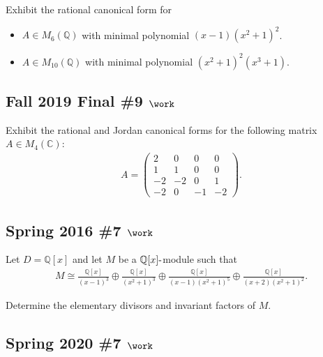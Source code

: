 Exhibit the rational canonical form for

\begin{itemize}
\tightlist
\item
  \(A\in M_6({\mathbb{Q}})\) with minimal polynomial
  \((x-1)(x^2 + 1)^2\).
\item
  \(A\in M_{10}({\mathbb{Q}})\) with minimal polynomial
  \((x^2+1)^2(x^3 + 1)\).
\end{itemize}

\hypertarget{fall-2019-final-9-work}{%
\subsection{\texorpdfstring{Fall 2019 Final \#9
\(\work\)}{Fall 2019 Final \#9 \textbackslash work}}\label{fall-2019-final-9-work}}

Exhibit the rational and Jordan canonical forms for the following matrix
\(A\in M_4({\mathbb{C}})\):
\begin{align*}
  A=\left(\begin{array}{cccc}
  2 & 0 & 0 & 0 \\
  1 & 1 & 0 & 0 \\
  -2 & -2 & 0 & 1 \\
  -2 & 0 & -1 & -2
  \end{array}\right)
  .\end{align*}

\hypertarget{spring-2016-7-work}{%
\subsection{\texorpdfstring{Spring 2016 \#7
\(\work\)}{Spring 2016 \#7 \textbackslash work}}\label{spring-2016-7-work}}

Let \(D = {\mathbb{Q}}[x]\) and let \(M\) be a
\({\mathbb{Q}}[x]{\hbox{-}}\)module such that
\begin{align*}
M \cong \frac{\mathbb{Q}[x]}{(x-1)^{3}} \oplus \frac{\mathbb{Q}[x]}{\left(x^{2}+1\right)^{3}} \oplus \frac{\mathbb{Q}[x]}{(x-1)\left(x^{2}+1\right)^{5}} \oplus \frac{\mathbb{Q}[x]}{(x+2)\left(x^{2}+1\right)^{2}}
.\end{align*}

Determine the elementary divisors and invariant factors of \(M\).

\hypertarget{spring-2020-7-work}{%
\subsection{\texorpdfstring{Spring 2020 \#7
\(\work\)}{Spring 2020 \#7 \textbackslash work}}\label{spring-2020-7-work}}

